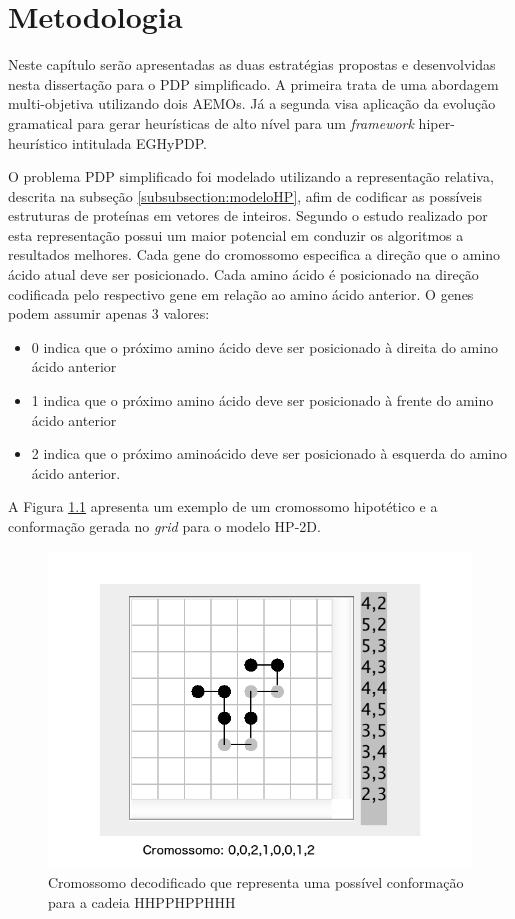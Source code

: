 \chapter{Metodologia}
\label{cap:Metodologia}

Neste capítulo serão apresentadas as duas estratégias propostas e desenvolvidas nesta dissertação para o PDP simplificado. A primeira trata de uma abordagem multi-objetiva utilizando dois AEMOs. Já a segunda visa aplicação da evolução gramatical  para gerar heurísticas de alto nível para um \textit{framework} hiper-heurístico intitulada EGHyPDP.


O problema PDP simplificado foi modelado utilizando a representação relativa, descrita na subseção \ref{subsubsection:modeloHP}, afim de codificar as possíveis estruturas de proteínas em vetores de inteiros. Segundo o estudo realizado por  \cite{krasnogor1999protein} esta representação possui um maior potencial em conduzir os algoritmos a resultados melhores. Cada gene do cromossomo especifica a direção que o amino ácido atual deve ser posicionado. Cada amino ácido é posicionado na direção codificada pelo respectivo gene em relação ao amino ácido anterior. O genes podem assumir apenas 3 valores:

\begin{itemize}
	\item 0 indica que o próximo amino ácido deve ser posicionado à direita do amino ácido anterior
	\item 1 indica que o próximo amino ácido deve ser posicionado à frente do amino ácido anterior
	\item 2 indica que o próximo aminoácido deve ser posicionado à esquerda do amino ácido anterior.
\end{itemize}

A Figura \ref{img:cromossomo} apresenta um exemplo de um cromossomo hipotético e a conformação gerada no \textit{grid} para o modelo HP-2D.


\begin{figure}[!htb]
	\centering
	\includegraphics[scale=0.36]{Imagens/DecodedCromossome.png}
	\caption{Cromossomo decodificado que representa uma possível conformação para a cadeia HHPPHPPHHH}
	\label{img:cromossomo}
\end{figure}



